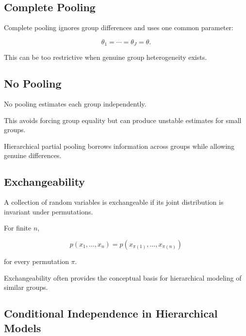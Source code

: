 \subsection{Complete Pooling}
\label{subsec:complete-pooling}

Complete pooling ignores group differences and uses one common parameter:

\[
\boxed{
\theta_1
=
\cdots
=
\theta_J
=
\theta.
}
\]

This can be too restrictive when genuine group heterogeneity exists.

\subsection{No Pooling}
\label{subsec:no-pooling}

No pooling estimates each group independently.

This avoids forcing group equality but can produce unstable estimates for
small groups.

Hierarchical partial pooling borrows information across groups while
allowing genuine differences.

\subsection{Exchangeability}
\label{subsec:bayesian-exchangeability}

A collection of random variables is exchangeable if its joint
distribution is invariant under permutations.

For finite \(n\),

\[
\boxed{
p
(
x_1,\ldots,x_n
)
=
p
(
x_{\pi(1)},\ldots,x_{\pi(n)}
)
}
\]

for every permutation \(\pi\).

Exchangeability often provides the conceptual basis for hierarchical
modeling of similar groups.

\subsection{Conditional Independence in Hierarchical Models}
\label{subsec:hierarchical-conditional-independence}

